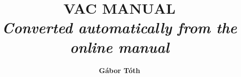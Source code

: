 \documentclass[twoside,10pt]{article}
\begin{document}
\title{VAC MANUAL\\
{\small \it Converted automatically from the online manual}}

\author{{\bf G\'abor T\'oth}}
\maketitle
\bigskip
\centerline{}
\newpage
\tableofcontents
\newpage

\end{document}
